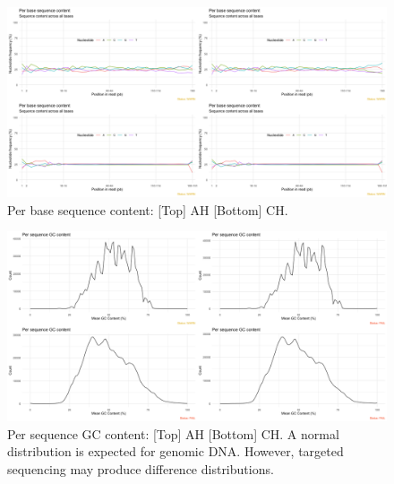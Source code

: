 \documentclass{article}
\begin{document}
\begin{figure}[h] \hspace*{0cm} 
\begin{center}
    \includegraphics[scale=0.25]{fastqcr/p3}
	\caption{Per base sequence content: [Top] AH [Bottom] CH.}
	\label{fig:p3}
\end{center}
\end{figure}

\begin{figure}[h] \hspace*{0cm} 
\begin{center}
    \includegraphics[scale=0.25]{fastqcr/p4}
	\caption{Per sequence GC content: [Top] AH [Bottom] CH.
	A normal distribution is expected for genomic DNA. However, targeted sequencing may produce difference distributions.}
	\label{fig:p4}
\end{center}
\end{figure}
\end{document}
